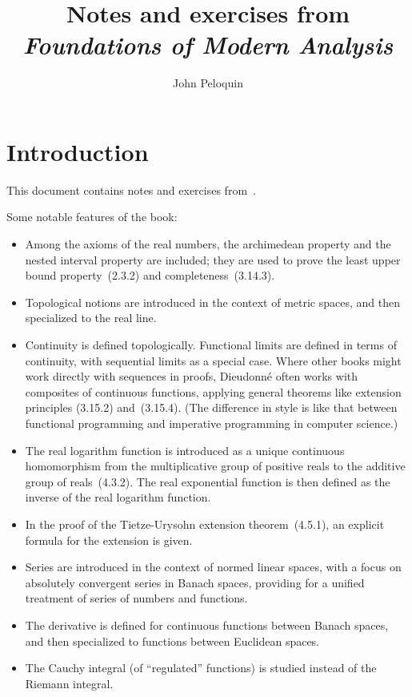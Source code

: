 \documentclass[letterpaper,12pt]{article}
\title{Notes and exercises from\\\textit{Foundations of Modern Analysis}}
\author{John Peloquin}
\date{}
\theoremstyle{plain}
\theoremstyle{definition}
\theoremstyle{remark}
\begin{document}
\maketitle

\section*{Introduction}
This document contains notes and exercises from~\cite{dieudonne}.

\medskip
\noindent Some notable features of the book:
\begin{itemize}[itemsep=0pt]
\item Among the axioms of the real numbers, the archimedean property and the nested interval property are included; they are used to prove the least upper bound property~(2.3.2) and completeness~(3.14.3).
\item Topological notions are introduced in the context of metric spaces, and then specialized to the real line.
\item Continuity is defined topologically. Functional limits are defined in terms of continuity, with sequential limits as a special case. Where other books might work directly with sequences in proofs, Dieudonn\'e often works with composites of continuous functions, applying general theorems like extension principles (3.15.2) and~(3.15.4). (The difference in style is like that between functional programming and imperative programming in computer science.)
\item The real logarithm function is introduced as a unique continuous homomorphism from the multiplicative group of positive reals to the additive group of reals~(4.3.2). The real exponential function is then defined as the inverse of the real logarithm function.
\item In the proof of the Tietze-Urysohn extension theorem~(4.5.1), an explicit formula for the extension is given.
\item Series are introduced in the context of normed linear spaces, with a focus on absolutely convergent series in Banach spaces, providing for a unified treatment of series of numbers and functions.
\item The derivative is defined for continuous functions between Banach spaces, and then specialized to functions between Euclidean spaces.
\item The Cauchy integral (of ``regulated'' functions) is studied instead of the Riemann integral.
\end{itemize}
\end{document}
